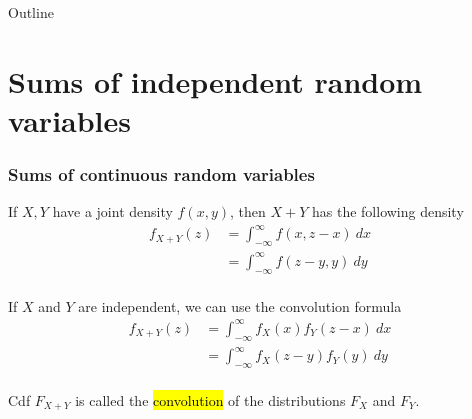 \documentclass[slidestop,compress,mathserif]{beamer}
\begin{document}
%
\begin{frame}{Outline}
\tableofcontents[hideallsubsections]
\end{frame}

%








\section{Sums of independent random variables}
\begin{frame}\frametitle{Sums of continuous random variables}

If $X,Y$ have a joint density $f(x,y)$, then $X+Y$ has the following density
\begin{align*}
f_{X+Y}(z) &= \int_{-\infty}^\infty f(x,z-x)~dx \\
           &= \int_{-\infty}^\infty f(z-y,y)~dy \\
\end{align*}

\vspace{-0.3cm} 
If $X$ and $Y$ are independent, we can use the convolution formula
\begin{align*}
f_{X+Y}(z) &= \int_{-\infty}^\infty f_X(x)f_Y(z-x)~dx \\
           &= \int_{-\infty}^\infty f_X(z-y)f_Y(y)~dy \\
\end{align*}

\vspace{-0.3cm} 
Cdf $F_{X+Y}$ is called the \hl{convolution} of the distributions $F_X$ and $F_Y$.


\end{frame}
\end{document}
